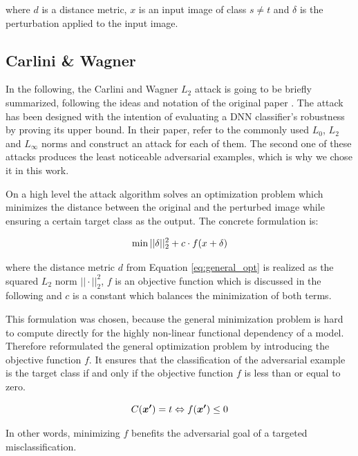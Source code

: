 where $d$ is a distance metric, $x$ is an input image of class $s \neq t$ and $\delta$ is the perturbation applied to the input image.

\subsection{Carlini \& Wagner}\label{subsec:cwl2}
In the following, the Carlini and Wagner $L_2$ attack is going to be briefly summarized, following the ideas and notation of the original paper \cite{carlini2017towards}.
The attack has been designed with the intention of evaluating a DNN classifier's robustness by proving its upper bound.
In their paper, \citeauthor{carlini2017towards} refer to the commonly used $L_0$, $L_2$ and $L_\infty$ norms and construct an attack for each of them.
The second one of these attacks produces the least noticeable adversarial examples, which is why we chose it in this work.

On a high level the attack algorithm solves an optimization problem which minimizes the distance between the original and the perturbed image while ensuring a certain target class as the output. The concrete formulation is:

\begin{equation}\label{eq:cw_general}
\min ||\delta||^2_2 + c \cdot f(x + \delta)
\vspace{1ex}
\end{equation}

where the distance metric $d$ from Equation \ref{eq:general_opt} is realized as the squared $L_2$ norm $||\cdot||^2_2$, $f$ is an objective function which is discussed in the following and $c$ is a constant which balances the minimization of both terms.

This formulation was chosen, because the general minimization problem is hard to compute directly for the highly non-linear functional dependency of a model. Therefore \citeauthor{carlini2017towards} reformulated the general optimization problem by introducing the objective function $f$.
It ensures that the classification of the adversarial example is the target class if and only if the objective function $f$ is less than or equal to zero.

\begin{equation*}
C(\myvec{x'}) = t \Leftrightarrow f(\myvec{x'}) \leq 0
\vspace{1ex}
\end{equation*}

In other words, minimizing $f$ benefits the adversarial goal of a targeted misclassification.

